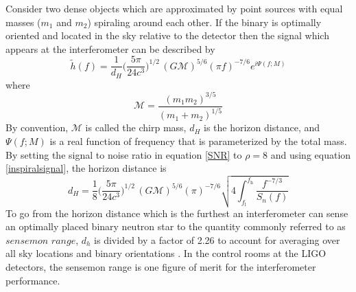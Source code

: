 	Consider two dense objects which are approximated by point sources with equal masses ($m_1$ and $m_2$) spiraling around each other. If the binary is optimally oriented and located in the sky relative to the detector then the signal which appears at the interferometer can be described by \cite{FinnChernoff}
	\begin{equation}\label{inspiralsignal}
	\tilde{h}(f) =\frac{1}{d_H} \bigg( \frac{5 \pi}{24 c^3}  \bigg)^{1/2} \, (G \mathcal{M})^{5/6} (\pi f)^{-7/6} e^{i\Psi(f;M)}
		\end{equation}
	where 
	\begin{subequations}
		\begin{equation}\label{chirp}
	\mathcal{M} =\frac{(m_1 m_2)^{3/5}}{(m_1 + m_2)^{1/5}}
		\end{equation}
	\end{subequations}
	By convention, $\mathcal{M}$ is called the chirp mass, $d_H$ is the horizon distance, and $\Psi(f;M)$ is a real function of frequency that is parameterized by the total mass.  By setting the signal to noise ratio in equation \ref{SNR} to $\rho=8$ and using equation \ref{inspiralsignal}, the horizon distance is
	\begin{equation}
	d_H = \frac{1}{8}  \bigg( \frac{5 \pi}{24 c^3}  \bigg)^{1/2} \, (G \mathcal{M})^{5/6} (\pi)^{-7/6} \sqrt{4 \int_{f_{\text{l}}}^{f_\text{h}} \frac{ f^{-7/3} }{S_n(f)}}
	\end{equation}
	To go from the horizon distance which is the furthest an interferometer can sense an optimally placed binary neutron star to the quantity commonly referred to as $sensemon$ $range$, $d_h$ is divided by a factor of 2.26 to account for averaging over all sky locations and binary orientations \cite{FinnChernoff}.  In the control rooms at the LIGO detectors, the sensemon range is one figure of merit for the interferometer performance.